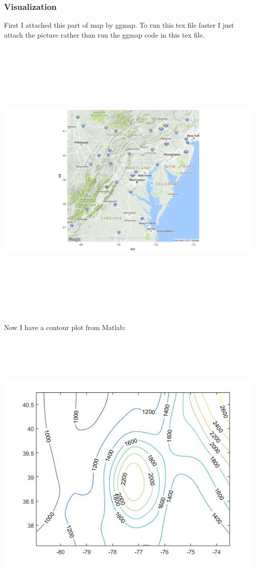 \documentclass[a4paper]{article}
\begin{document}
\subsubsection{Visualization}
First I attached this part of map by ggmap. To run this tex file faster I just attach the picture rather than run the ggmap code in this tex file.\\
\includegraphics[width=15cm,height=15cm,keepaspectratio]{Rplot}\\
Now I have a contour plot from Matlab:\\
\includegraphics[width=15cm,height=15cm,keepaspectratio]{contour}\\
\end{document}
